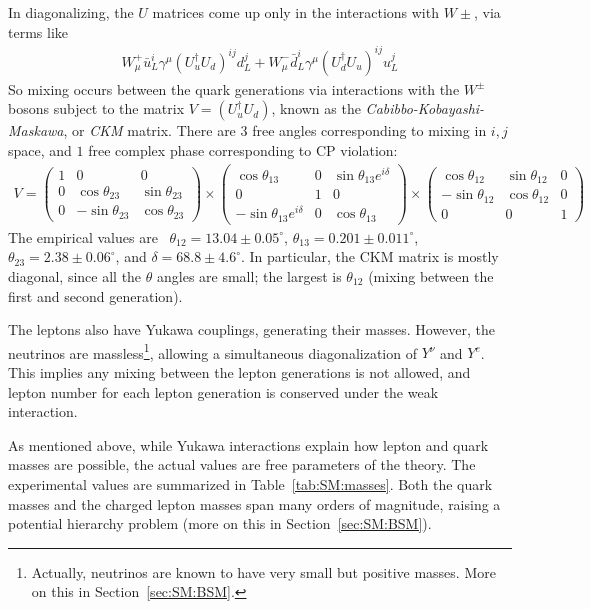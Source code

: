 In diagonalizing, the $U$ matrices come up only in the interactions with $W\pm$, via terms like
\begin{align}
  W^+_\mu\bar{u}_L^i\gamma^\mu\left(U_u^\dagger U_d\right)^{ij} d_L^j + W^-_\mu\bar{d}_L^i\gamma^\mu\left(U_d^\dagger U_u\right)^{ij} u_L^j
\end{align}
So mixing occurs between the quark generations via interactions with the $W^\pm$ bosons subject to the matrix $V=\left(U_u^\dagger U_d\right)$, known as the \textit{Cabibbo-Kobayashi-Maskawa}, or \textit{CKM} matrix.
There are $3$ free angles corresponding to mixing in $i,j$ space, and $1$ free complex phase corresponding to CP violation:
\begin{align}
V = \begin{pmatrix} 1 & 0 & 0 \\ 0 & \cos\theta_{23} & \sin\theta_{23} \\ 0 & -\sin\theta_{23} & \cos\theta_{23} \end{pmatrix}\times
\begin{pmatrix} \cos\theta_{13} & 0 & \sin\theta_{13}e^{i\delta} \\ 0 & 1 & 0 \\-\sin\theta_{13}e^{i\delta} & 0 & \cos\theta_{13} \end{pmatrix}\times
\begin{pmatrix} \cos\theta_{12} & \sin\theta_{12} & 0 \\ -\sin\theta_{12} & \cos\theta_{12} & 0 \\ 0 & 0 & 1 \end{pmatrix}
\end{align}
The empirical values are~\cite{PDG} $\theta_{12}=13.04\pm0.05^\circ$, $\theta_{13}=0.201\pm0.011^\circ$, $\theta_{23}=2.38\pm0.06^\circ$, and $\delta=68.8\pm4.6^\circ$.
In particular, the CKM matrix is mostly diagonal, since all the $\theta$ angles are small; the largest is $\theta_{12}$ (mixing between the first and second generation).

The leptons also have Yukawa couplings, generating their masses.
However, the neutrinos are massless\footnote{Actually, neutrinos are known to have very small but positive masses. More on this in Section~\ref{sec:SM:BSM}.}, allowing a simultaneous diagonalization of $Y^\nu$ and $Y^e$.
This implies any mixing between the lepton generations is not allowed, and lepton number for each lepton generation is conserved under the weak interaction.

As mentioned above, while Yukawa interactions explain how lepton and quark masses are possible, the actual values are free parameters of the theory.
The experimental values are summarized in Table~\ref{tab:SM:masses}.
Both the quark masses and the charged lepton masses span many orders of magnitude, raising a potential hierarchy problem (more on this in Section~\ref{sec:SM:BSM}).

